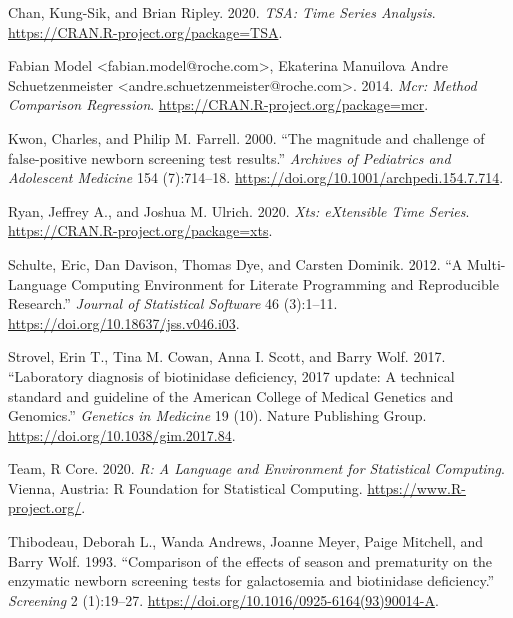 \documentclass[review]{elsarticle}
\begin{document}
\begin{hangparas}{1.5em}{1}
\hypertarget{citeproc_bib_item_1}{Chan, Kung-Sik, and Brian Ripley. 2020. \textit{TSA: Time Series Analysis}. \href{https://CRAN.R-project.org/package=TSA}{https://CRAN.R-project.org/package=TSA}.}

\hypertarget{citeproc_bib_item_2}{Fabian Model <fabian.model@roche.com>, Ekaterina Manuilova Andre Schuetzenmeister <andre.schuetzenmeister@roche.com>. 2014. \textit{Mcr: Method Comparison Regression}. \href{https://CRAN.R-project.org/package=mcr}{https://CRAN.R-project.org/package=mcr}.}

\hypertarget{citeproc_bib_item_3}{Kwon, Charles, and Philip M. Farrell. 2000. “The magnitude and challenge of false-positive newborn screening test results.” \textit{Archives of Pediatrics and Adolescent Medicine} 154 (7):714–18. \href{https://doi.org/10.1001/archpedi.154.7.714}{https://doi.org/10.1001/archpedi.154.7.714}.}

\hypertarget{citeproc_bib_item_4}{Ryan, Jeffrey A., and Joshua M. Ulrich. 2020. \textit{Xts: eXtensible Time Series}. \href{https://CRAN.R-project.org/package=xts}{https://CRAN.R-project.org/package=xts}.}

\hypertarget{citeproc_bib_item_5}{Schulte, Eric, Dan Davison, Thomas Dye, and Carsten Dominik. 2012. “A Multi-Language Computing Environment for Literate Programming and Reproducible Research.” \textit{Journal of Statistical Software} 46 (3):1–11. \href{https://doi.org/10.18637/jss.v046.i03}{https://doi.org/10.18637/jss.v046.i03}.}

\hypertarget{citeproc_bib_item_6}{Strovel, Erin T., Tina M. Cowan, Anna I. Scott, and Barry Wolf. 2017. “Laboratory diagnosis of biotinidase deficiency, 2017 update: A technical standard and guideline of the American College of Medical Genetics and Genomics.” \textit{Genetics in Medicine} 19 (10). Nature Publishing Group. \href{https://doi.org/10.1038/gim.2017.84}{https://doi.org/10.1038/gim.2017.84}.}

\hypertarget{citeproc_bib_item_7}{Team, R Core. 2020. \textit{R: A Language and Environment for Statistical Computing}. Vienna, Austria: R Foundation for Statistical Computing. \href{https://www.R-project.org/}{https://www.R-project.org/}.}

\hypertarget{citeproc_bib_item_8}{Thibodeau, Deborah L., Wanda Andrews, Joanne Meyer, Paige Mitchell, and Barry Wolf. 1993. “Comparison of the effects of season and prematurity on the enzymatic newborn screening tests for galactosemia and biotinidase deficiency.” \textit{Screening} 2 (1):19–27. \href{https://doi.org/10.1016/0925-6164(93)90014-A}{https://doi.org/10.1016/0925-6164(93)90014-A}.}


\end{hangparas}
\end{document}
